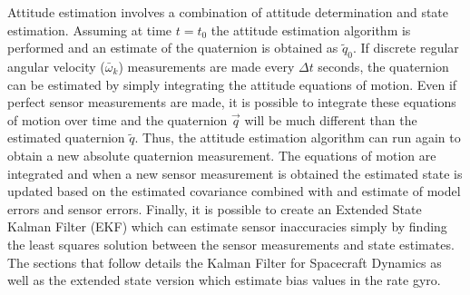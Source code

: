 Attitude estimation involves a combination of attitude determination
and state estimation. Assuming at time $t=t_0$ the attitude estimation
algorithm is performed and an estimate of the quaternion is obtained
as $\tilde{q}_0$. If discrete regular angular velocity
($\bar{\omega}_{k}$) measurements are made every $\Delta t$ seconds,
the quaternion can be estimated by simply integrating the attitude
equations of motion. Even if perfect sensor measurements are made, it
is possible to integrate these equations of motion over time and the
quaternion $\vec{q}$ will be much different than the estimated
quaternion $\tilde{q}$. Thus, the attitude estimation algorithm can
run again to obtain a new absolute quaternion measurement. The
equations of motion are integrated and when a new sensor measurement
is obtained the estimated state is updated based on the estimated
covariance combined with and estimate of model errors and sensor
errors. Finally, it is possible to 
create an Extended State Kalman Filter (EKF) which can estimate
sensor inaccuracies simply by finding the least squares solution
between the sensor measurements and state estimates. The sections that
follow details the Kalman Filter for Spacecraft Dynamics as well as
the extended state version which estimate bias values in the rate gyro.
  
